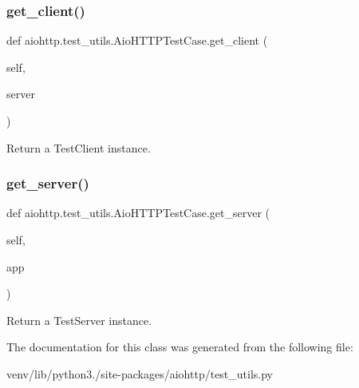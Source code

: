 \subsubsection{\texorpdfstring{get\+\_\+client()}{get\_client()}}
{\footnotesize\ttfamily def aiohttp.\+test\+\_\+utils.\+Aio\+H\+T\+T\+P\+Test\+Case.\+get\+\_\+client (\begin{DoxyParamCaption}\item[{}]{self,  }\item[{}]{server }\end{DoxyParamCaption})}

\begin{DoxyVerb}Return a TestClient instance.\end{DoxyVerb}
 \mbox{\label{classaiohttp_1_1test__utils_1_1_aio_h_t_t_p_test_case_aac2a9727aa230f539d32565db240cd08}} 
\subsubsection{\texorpdfstring{get\+\_\+server()}{get\_server()}}
{\footnotesize\ttfamily def aiohttp.\+test\+\_\+utils.\+Aio\+H\+T\+T\+P\+Test\+Case.\+get\+\_\+server (\begin{DoxyParamCaption}\item[{}]{self,  }\item[{}]{app }\end{DoxyParamCaption})}

\begin{DoxyVerb}Return a TestServer instance.\end{DoxyVerb}
 

The documentation for this class was generated from the following file\+:\begin{DoxyCompactItemize}
\item 
venv/lib/python3./site-\/packages/aiohttp/test\+\_\+utils.\+py\end{DoxyCompactItemize}
